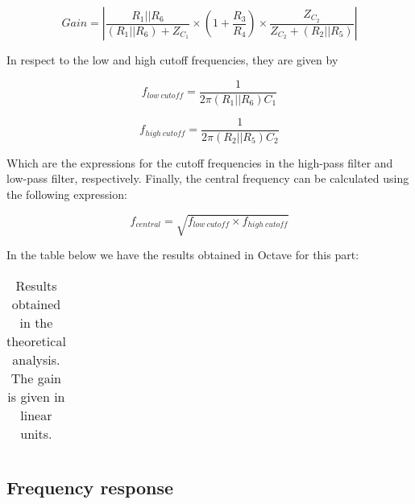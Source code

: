 \begin{equation}
Gain = \left| \frac{R_1||R_6}{(R_1||R_6) + Z_{C_1}} \times  \left(1+\frac{R_3}{R_4}\right) \times \frac{Z_{C_2}}{Z_{C_2}+(R_2||R_5)} \right|
\end{equation}



In respect to the low and high cutoff frequencies, they are given by 

\begin{equation}
f_{low \ cutoff} = \frac{1}{2 \pi (R_1||R_6) C_1}
\end{equation}

\begin{equation}
f_{high \ cutoff} = \frac{1}{2 \pi (R_2||R_5) C_2}
\end{equation}

Which are the expressions for the cutoff frequencies in the high-pass filter and low-pass filter, respectively. Finally, the central frequency can be calculated using the following expression:

\begin{equation}
f_{central} = \sqrt{f_{low \ cutoff} \times f_{high \ cutoff}}
\end{equation}

In the table below we have the results obtained in Octave for this part:

\begin{table}[H]
  \centering
  \begin{tabular}{|c|c|}
    \hline
      
  \end{tabular}
  \caption{Results obtained in the theoretical analysis. The gain is given in linear units.}
  \label{tab:results}
\end{table}





\subsection{Frequency response}

